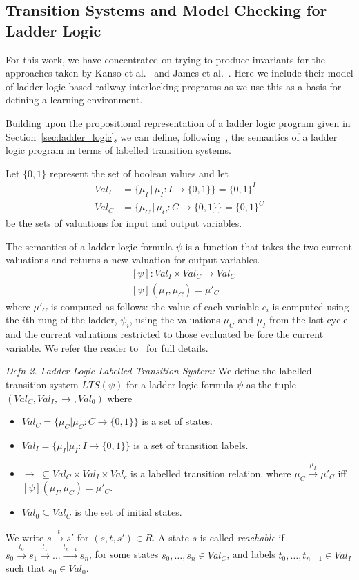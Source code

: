 \documentclass[runningheads]{llncs}
\begin{document}
\subsection{Transition Systems and Model Checking for Ladder Logic}
For this work, we have concentrated on trying to produce invariants for the approaches taken by Kanso et al.~\cite{kanso2009automated} and James et al.~\cite{james2013verification}. Here we include their model of ladder logic based railway interlocking programs as we use this as a basis for defining a learning environment.

Building upon the propositional representation of a ladder logic program given in Section~\ref{sec:ladder_logic}, we can define, following~\cite{james2013verification}, the semantics of a ladder logic program in terms of labelled transition systems.

Let $\{0,1\}$ represent the set of boolean values and let
\begin{align*}
	Val_I  &= \{ \mu_I \, | \, \mu_I : I \to \{0 , 1 \} \}  = \{0,1 \}^I   \\
	Val_C &=  \{ \mu_C \, | \, \mu_C : C \to \{ 0 , 1 \} \} = \{ 0,1 \}^C 
\end{align*}
be the sets of valuations for input and output variables.

The semantics of a ladder logic formula $\psi$ is a function that takes the two current valuations and returns a new
valuation for output variables.
\begin{align*}
	& [ \psi ] : Val_I \times Val_C \to  Val_C \\
	& [ \psi ] ( \mu_I, \mu_C ) = \mu'_C 
\end{align*}
where $\mu'_C$ is computed as follows: the value of each variable $c_i$ is computed using the $i$th rung of the ladder, $\psi_i$, using the valuations $\mu_C$ and $\mu_I$ from the last cycle and the current valuations restricted to those evaluated be fore the current variable. We refer the reader to~\cite{james2013verification} for full details.

\textit{Defn 2. Ladder Logic Labelled Transition System:}
We define the labelled transition system $LTS(\psi)$ for a ladder logic formula $\psi$ as the tuple $(Val_C,Val_I,\rightarrow, Val_0)$ where
\begin{itemize}
	\item $Val_C = \{ \mu_C | \mu_C : C \to \{ 0 , 1 \} \}$ is a set of states.
	\item $Val_I = \{ \mu_I | \mu_I : I \to \{0 , 1 \} \}$ is a set of transition labels.
	\item $\rightarrow \; \subseteq Val_C \times Val_I \times Val_c $ is a labelled transition relation, where $\mu_C \xrightarrow{\mu_I} \mu'_C$ iff  $[ \psi ] ( \mu_I , \mu_C) = \mu'_C$.
	\item $ Val_0 \subseteq Val_C$ is the set of initial states.
	
\end{itemize}
%
We write $ s \xrightarrow{t} s'$ for $(s,t,s')\in R$.
A state $s$ is called \emph{reachable} if 
$s_0 \xrightarrow{t_0} s_{1} \xrightarrow{t_1} \ldots 
\xrightarrow{t_{n-1}} s_n$,  
for some states $s_0,\ldots, s_{n} \in Val_C$, and 
labels $t_0, \ldots, t_{n-1} \in Val_I$ such that
$s_0 \in Val_0$.  
\end{document}
